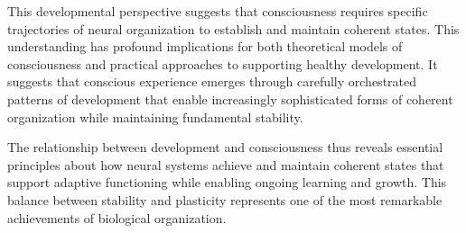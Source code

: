 This developmental perspective suggests that consciousness requires specific trajectories of neural organization to establish and maintain coherent states. This understanding has profound implications for both theoretical models of consciousness and practical approaches to supporting healthy development. It suggests that conscious experience emerges through carefully orchestrated patterns of development that enable increasingly sophisticated forms of coherent organization while maintaining fundamental stability.

The relationship between development and consciousness thus reveals essential principles about how neural systems achieve and maintain coherent states that support adaptive functioning while enabling ongoing learning and growth. This balance between stability and plasticity represents one of the most remarkable achievements of biological organization.